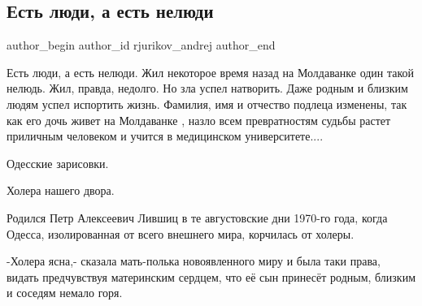  
 
 
 
 
 
\subsection{Есть люди, а есть нелюди}
\label{sec:26_08_2021.fb.rjurikov_andrej.1.ludi_neludi_odessa}
 
\ifcmt
 author_begin
   author_id rjurikov_andrej
 author_end
\fi

Есть люди, а есть нелюди. Жил некоторое время назад  на Молдаванке один такой
нелюдь. Жил, правда, недолго. Но зла успел натворить. Даже родным и близким
людям успел испортить жизнь. Фамилия, имя и отчество подлеца изменены, так как
его дочь  живет на Молдаванке , назло всем превратностям судьбы растет
приличным человеком и учится в медицинском университете....

Одесские зарисовки.

Холера нашего двора.

Родился Петр Алексеевич Лившиц в те августовские  дни 1970-го года, когда
Одесса, изолированная от всего внешнего мира, корчилась от холеры.

-Холера ясна,- сказала мать-полька новоявленного миру и была таки права, видать
предчувствуя материнским сердцем, что её сын принесёт родным, близким и соседям
немало горя.

